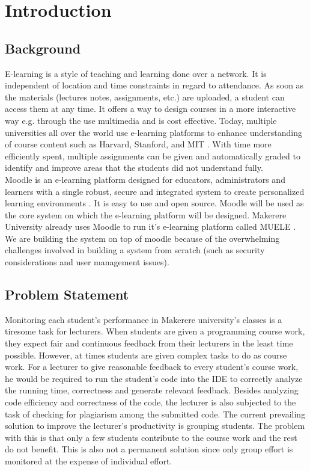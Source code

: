 \documentclass[12pt]{article}
\begin{document}
\section{Introduction}
	\subsection{Background}
		E-learning is a style of teaching and learning done over a network. It is independent of location and time constraints in regard to attendance. As soon as the materials (lectures notes, assignments, etc.) are uploaded, a student can access them at any time. It offers a way to design courses in a more interactive way e.g. through the use multimedia and is
		cost effective. Today, multiple universities all over the world use e-learning platforms to enhance understanding of course content such as Harvard, Stanford, and MIT \cite{singh}. With time more efficiently spent, multiple assignments can be given and automatically graded to identify and improve areas that the students did not understand fully. \\
		
		Moodle is an e-learning platform designed for educators, administrators and learners with a single robust, secure and integrated system to create personalized learning environments \cite{moodle}. It is easy to use and open source. Moodle will be used as the core system on which the e-learning platform will be designed. Makerere University already uses Moodle to run it's e-learning platform called MUELE \cite{muele}. We are building the system on top of moodle because of the overwhelming challenges involved in building a system from scratch (such as security considerations and user management issues).
	\subsection{Problem Statement}
		Monitoring each student's performance in Makerere university's classes is a tiresome task for lecturers. When students are given a programming course work, they expect fair and continuous feedback from their lecturers in the least time possible. However, at times students are given complex tasks to do as course work. For a lecturer to give reasonable feedback to every student's course work, he would be required to run the student’s code into the IDE to correctly analyze the running time, correctness and generate relevant feedback. Besides analyzing code efficiency and correctness of the code, the lecturer is also subjected to the task of checking for plagiarism among the submitted code. The current prevailing solution to improve the lecturer's productivity is grouping students. The problem with this is that only a few students contribute to the course work and the rest do not benefit. This is also not a permanent solution
		since only group effort is monitored at the expense of individual effort.
		
\end{document}
